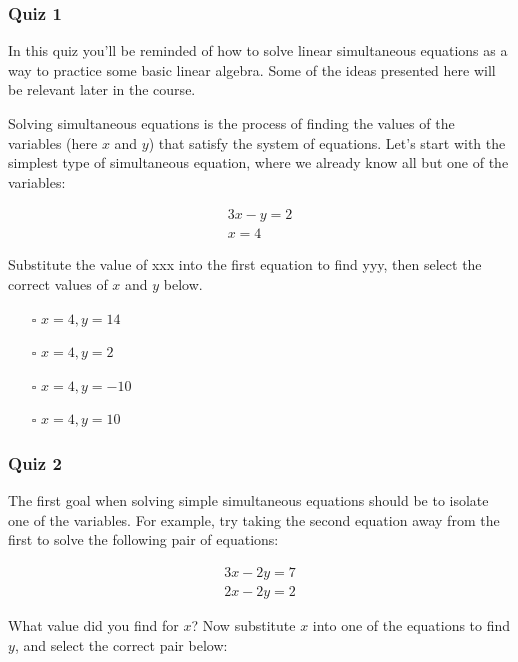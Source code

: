 \documentclass[]{article}
\begin{document}
\subsubsection{Quiz 1}

In this quiz you'll be reminded of how to solve linear simultaneous equations as a way to practice some basic linear algebra. Some of the ideas presented here will be relevant later in the course.

Solving simultaneous equations is the process of finding the values of the variables (here $ x $ and $ y $) that satisfy the system of equations. Let's start with the simplest type of simultaneous equation, where we already know all but one of the variables:

\begin{equation} \label{}
\begin{split}
	3x - y = 2 \\
	x = 4
\end{split}
\end{equation}

Substitute the value of xxx into the first equation to find yyy, then select the correct values of $ x $ and $ y $ below.

\begin{itemize}
	\item[$\square$] $ x = 4, y = 14 $
	\item[$\square$] $ x = 4, y = 2 $
	\item[$\square$] $ x = 4, y = -10 $
	\item[$\square$] $ x = 4, y = 10 $
\end{itemize}

\subsubsection{Quiz 2}

The first goal when solving simple simultaneous equations should be to isolate one of the variables. For example, try taking the second equation away from the first to solve the following pair of equations:

\begin{equation} \label{}
\begin{split}
3x - 2y = 7 \\
2x - 2y = 2
\end{split}
\end{equation}

What value did you find for $ x $? Now substitute $ x $ into one of the equations to find $ y $, and select the correct pair below:
\end{document}

